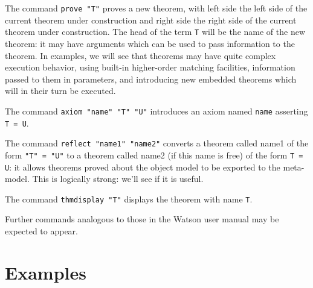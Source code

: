 \documentclass[12pt]{article}
\begin{document}
The command {\tt prove "T"} proves a new theorem, with left side the left side
of the current theorem under construction and right side the right side of the
current theorem under construction.  The head of the term {\tt T} will be
the name of the new theorem:  it may have arguments which can be used to pass
information to the theorem.  In examples, we will see that theorems may have
quite complex execution behavior, using built-in higher-order matching
facilities, information passed to them in parameters, and introducing new
embedded theorems which will in their turn be executed.

The command {\tt axiom "name" "T" "U"} introduces an axiom named {\tt name}
asserting {\tt T = U}.

The command {\tt reflect "name1" "name2"} converts a theorem called
name1 of the form {\tt "T" = "U"} to a theorem called name2 (if this name
is free) of the form {\tt T = U}:  it allows theorems proved about the object
model to be exported to the meta-model.  This is logically strong:  we'll
see if it is useful.

The command {\tt thmdisplay "T"} displays the theorem with name {\tt T}.

Further commands analogous to those in the Watson user manual may be expected
to appear.

\section{Examples}
\end{document}
